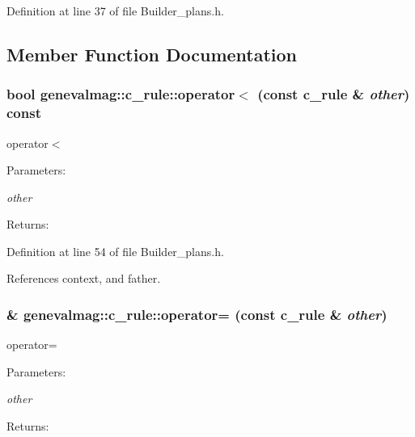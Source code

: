 Definition at line 37 of file Builder\_\-plans.h.

\subsection{Member Function Documentation}
\hypertarget{structgenevalmag_1_1c__rule_3928c94cdc0cbf19afd122f7b5f55cba}{
\subsubsection[{operator$<$}]{\setlength{\rightskip}{0pt plus 5cm}bool genevalmag::c\_\-rule::operator$<$ (const {\bf c\_\-rule} \& {\em other}) const}}
\label{structgenevalmag_1_1c__rule_3928c94cdc0cbf19afd122f7b5f55cba}


operator$<$ \begin{Desc}
\item[Parameters:]
\begin{description}
\item[{\em other}]\end{description}
\end{Desc}
\begin{Desc}
\item[Returns:]\end{Desc}


Definition at line 54 of file Builder\_\-plans.h.

References context, and father.\hypertarget{structgenevalmag_1_1c__rule_84c13f21cf310be7b9f8eb5677806581}{
\subsubsection[{operator=}]{\& genevalmag::c\_\-rule::operator= (const {\bf c\_\-rule} \& {\em other})}}
\label{structgenevalmag_1_1c__rule_84c13f21cf310be7b9f8eb5677806581}


operator= \begin{Desc}
\item[Parameters:]
\begin{description}
\item[{\em other}]\end{description}
\end{Desc}
\begin{Desc}
\item[Returns:]\end{Desc}


